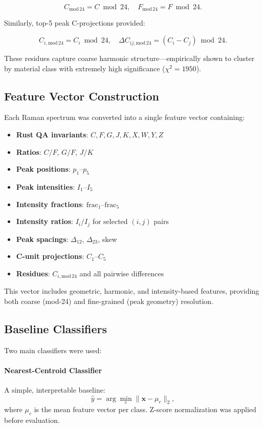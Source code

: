 \documentclass[12pt]{article}
\begin{document}
\[
C_{\mathrm{mod}\,24} = C \bmod 24,\quad 
F_{\mathrm{mod}\,24} = F \bmod 24.
\]

Similarly, top-5 peak C-projections provided:

\[
C_{i,\mathrm{mod}\,24} = C_i \bmod 24,
\quad 
\Delta C_{ij,\mathrm{mod}\,24} = (C_i - C_j) \bmod 24.
\]

These residues capture coarse harmonic structure—empirically shown to cluster by material class with
extremely high significance ($\chi^2 = 1950$).

\subsection{Feature Vector Construction}

Each Raman spectrum was converted into a single feature vector containing:

\begin{itemize}
    \item \textbf{Rust QA invariants}: $C,F,G,J,K,X,W,Y,Z$
    \item \textbf{Ratios}: $C/F$, $G/F$, $J/K$
    \item \textbf{Peak positions}: $p_1$–$p_5$
    \item \textbf{Peak intensities}: $I_1$–$I_5$
    \item \textbf{Intensity fractions}: $\mathrm{frac}_1$–$\mathrm{frac}_5$
    \item \textbf{Intensity ratios}: $I_i/I_j$ for selected $(i,j)$ pairs
    \item \textbf{Peak spacings}: $\Delta_{12}$, $\Delta_{23}$, skew
    \item \textbf{C-unit projections}: $C_1$–$C_5$
    \item \textbf{Residues}: $C_{i,\mathrm{mod}\,24}$ and all pairwise differences
\end{itemize}

This vector includes geometric, harmonic, and intensity-based features, providing both coarse (mod-24) and
fine-grained (peak geometry) resolution.

\subsection{Baseline Classifiers}

Two main classifiers were used:

\paragraph{Nearest-Centroid Classifier}
A simple, interpretable baseline:
\[
\hat{y} = \arg\min_{c} \lVert \mathbf{x} - \mu_{c} \rVert_2,
\]
where $\mu_c$ is the mean feature vector per class.  
Z-score normalization was applied before evaluation.
\end{document}
